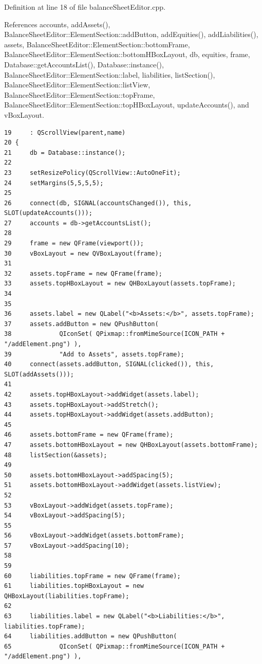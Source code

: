 Definition at line 18 of file balance\-Sheet\-Editor.cpp.

References accounts, add\-Assets(), Balance\-Sheet\-Editor::Element\-Section::add\-Button, add\-Equities(), add\-Liabilities(), assets, Balance\-Sheet\-Editor::Element\-Section::bottom\-Frame, Balance\-Sheet\-Editor::Element\-Section::bottom\-HBox\-Layout, db, equities, frame, Database::get\-Accounts\-List(), Database::instance(), Balance\-Sheet\-Editor::Element\-Section::label, liabilities, list\-Section(), Balance\-Sheet\-Editor::Element\-Section::list\-View, Balance\-Sheet\-Editor::Element\-Section::top\-Frame, Balance\-Sheet\-Editor::Element\-Section::top\-HBox\-Layout, update\-Accounts(), and v\-Box\-Layout.

\footnotesize\begin{verbatim}19     : QScrollView(parent,name)
20 {
21     db = Database::instance();
22 
23     setResizePolicy(QScrollView::AutoOneFit);
24     setMargins(5,5,5,5);
25     
26     connect(db, SIGNAL(accountsChanged()), this, SLOT(updateAccounts()));
27     accounts = db->getAccountsList();
28    
29     frame = new QFrame(viewport());
30     vBoxLayout = new QVBoxLayout(frame);
31     
32     assets.topFrame = new QFrame(frame);
33     assets.topHBoxLayout = new QHBoxLayout(assets.topFrame);
34     
35     
36     assets.label = new QLabel("<b>Assets:</b>", assets.topFrame);
37     assets.addButton = new QPushButton(
38             QIconSet( QPixmap::fromMimeSource(ICON_PATH + "/addElement.png") ),
39             "Add to Assets", assets.topFrame);
40     connect(assets.addButton, SIGNAL(clicked()), this, SLOT(addAssets()));
41 
42     assets.topHBoxLayout->addWidget(assets.label);
43     assets.topHBoxLayout->addStretch();
44     assets.topHBoxLayout->addWidget(assets.addButton);
45     
46     assets.bottomFrame = new QFrame(frame);
47     assets.bottomHBoxLayout = new QHBoxLayout(assets.bottomFrame);
48     listSection(&assets);
49     
50     assets.bottomHBoxLayout->addSpacing(5);
51     assets.bottomHBoxLayout->addWidget(assets.listView);
52     
53     vBoxLayout->addWidget(assets.topFrame);
54     vBoxLayout->addSpacing(5);
55 
56     vBoxLayout->addWidget(assets.bottomFrame);
57     vBoxLayout->addSpacing(10);
58    
59 
60     liabilities.topFrame = new QFrame(frame);
61     liabilities.topHBoxLayout = new QHBoxLayout(liabilities.topFrame);
62     
63     liabilities.label = new QLabel("<b>Liabilities:</b>", liabilities.topFrame);
64     liabilities.addButton = new QPushButton(
65             QIconSet( QPixmap::fromMimeSource(ICON_PATH + "/addElement.png") ),

\end{verbatim}
